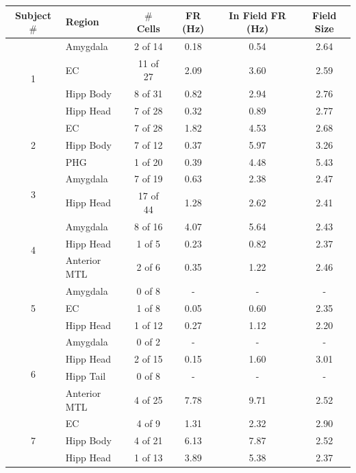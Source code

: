 \begin{table}[ph]
\centering
 \begin{tabular}{|c|lcccc|}
\hline
Subject $\#$ & Region & $\#$ Cells & FR (Hz) & In Field FR (Hz) & Field Size\\\hline

\multirow{4}{*}{1} & Amygdala & 2 of 14  & 0.18 & 0.54 & 2.64 \\ 
 & EC & 11 of 27  & 2.09 & 3.60 & 2.59 \\ 
 & Hipp Body & 8 of 31  & 0.82 & 2.94 & 2.76 \\ 
 & Hipp Head & 7 of 28  & 0.32 & 0.89 & 2.77 \\ \hline
\multirow{3}{*}{2} & EC & 7 of 28  & 1.82 & 4.53 & 2.68 \\ 
 & Hipp Body & 7 of 12  & 0.37 & 5.97 & 3.26 \\ 
 & PHG & 1 of 20  & 0.39 & 4.48 & 5.43 \\ \hline
\multirow{2}{*}{3} & Amygdala & 7 of 19  & 0.63 & 2.38 & 2.47 \\ 
 & Hipp Head & 17 of 44  & 1.28 & 2.62 & 2.41 \\ \hline
\multirow{3}{*}{4} & Amygdala & 8 of 16  & 4.07 & 5.64 & 2.43 \\ 
 & Hipp Head & 1 of 5  & 0.23 & 0.82 & 2.37 \\ 
 & Anterior MTL & 2 of 6  & 0.35 & 1.22 & 2.46 \\ \hline
\multirow{3}{*}{5} & Amygdala & 0 of 8  & - & - & - \\ 
 & EC & 1 of 8  & 0.05 & 0.60 & 2.35 \\ 
 & Hipp Head & 1 of 12  & 0.27 & 1.12 & 2.20 \\ \hline
\multirow{4}{*}{6} & Amygdala & 0 of 2  & - & - & - \\  
 & Hipp Head & 2 of 15  & 0.15 & 1.60 & 3.01 \\ 
 & Hipp Tail & 0 of 8  & - & - & - \\ 
 & Anterior MTL & 4 of 25  & 7.78 & 9.71 & 2.52 \\ \hline
\multirow{3}{*}{7} & EC & 4 of 9  & 1.31 & 2.32 & 2.90 \\ 
 & Hipp Body & 4 of 21  & 6.13 & 7.87 & 2.52 \\ 
 & Hipp Head & 1 of 13  & 3.89 & 5.38 & 2.37 \\ 
\hline
    \end{tabular}

\end{table}

